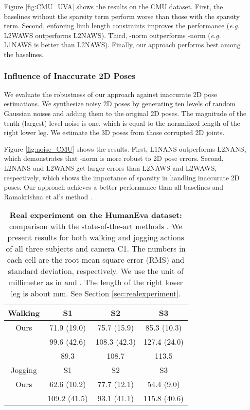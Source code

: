 \documentclass[10pt,twocolumn,letterpaper]{article}
\begin{document}
Figure \ref{fig:CMU_UVA} shows the results on the CMU dataset.
First, the baselines without the sparsity term perform worse than
those with the sparsity term. Second, enforcing limb length constraints improves the
performance ({\it e.g.} L2WAWS outperforms L2NAWS). Third, -norm
outperforms -norm ({\it e.g.} L1NAWS is better than L2NAWS). Finally, our
approach performs best among the baselines.


\subsubsection{Influence of Inaccurate 2D Poses}
\label{sec:influenc_inaccurate} We evaluate the robustness of our
approach against inaccurate 2D pose estimations. We synthesize noisy 2D poses by generating ten
levels of random Gaussian noises and adding them to the original 2D poses. The
magnitude of the tenth (largest) level noise is one, which is equal to the normalized length of the right lower leg.
We estimate the 3D poses from those corrupted 2D joints.

Figure \ref{fig:noise_CMU} shows the results. First, L1NANS
outperforms L2NANS, which demonstrates that -norm is more
robust to 2D pose errors. Second, L2NANS and L2WANS get larger
errors than L2NAWS and L2WAWS, respectively, which shows the
importance of sparsity in handling inaccurate 2D poses. Our
approach achieves a better performance than all baselines and
Ramakrishna et al's method \cite{Ramakrishna}.

\begin{table}
\caption{\textbf{Real experiment on the HumanEva dataset:}
comparison with the state-of-the-art methods
\cite{SimoSerraCVPR2012} \cite{Daubney}. We present results for
both walking and jogging actions of all three subjects and camera
C1. The numbers in each cell are the root mean square error (RMS)
and standard deviation, respectively. We use the unit of
millimeter as in \cite{SimoSerraCVPR2012} and \cite{Daubney}. The
length of the right lower leg is about  mm. See Section
\ref{sec:realexperiment}.} \centering
\begin{tabular}{|c|c|c|c|}
\hline
Walking & S1 & S2 & S3 \\
\hline
Ours & 71.9 (19.0) & 75.7 (15.9) & 85.3 (10.3) \\
\hline
\cite{SimoSerraCVPR2012} & 99.6 (42.6) & 108.3 (42.3) & 127.4 (24.0) \\
\hline
\cite{Daubney} & 89.3 & 108.7 & 113.5 \\
\hline

\hline
\hline
Jogging & S1 & S2 & S3 \\
\hline
Ours & 62.6 (10.2) & 77.7 (12.1) & 54.4 (9.0) \\
\hline
\cite{SimoSerraCVPR2012} & 109.2 (41.5) & 93.1 (41.1) & 115.8 (40.6) \\
\hline
\end{tabular}
\label{table:stateofart}
\end{table}
\end{document}
